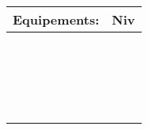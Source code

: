 \begin{landscape}
\begin{multicols}{2}
\vspace{3pt} 	

\noindent\begin{tabularx}{\columnwidth}{|X|r|}
	\hline
	\cellcolor{black!10} 
	Equipements: &
	\cellcolor{black!10} 
	Niv\\ \hline
	 & \\ \hline
	 & \\ \hline
	 & \\ \hline
	 & \\ \hline
	 & \\ \hline
	 & \\ \hline
	 & \\ \hline
	 & \\ \hline
	 & \\ \hline
	 & \\ \hline
	 & \\ \hline
	 & \\ \hline
	 & \\ \hline
	 & \\ \hline
	 & \\ \hline
	 & \\ \hline
	 & \\ \hline
	 & \\ \hline
	 & \\ \hline
\end{tabularx}

\pagebreak

\end{multicols}

\end{landscape}


